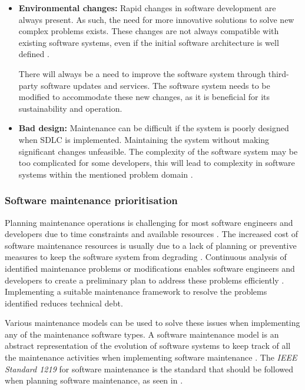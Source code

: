 \begin{itemize}
	\item \textbf{Environmental changes:} Rapid changes in software development are always present. As such, the need for more innovative solutions to solve new complex problems exists. These changes are not always compatible with existing software systems, even if the initial software architecture is well defined \cite{Ogheneovo2014}. \par There will always be a need to improve the software system through third-party software updates and services. The software system needs to be modified to accommodate these new changes, as it is beneficial for its sustainability and operation.
	\item \textbf{Bad design:} Maintenance can be difficult if the system is poorly designed when SDLC is implemented. Maintaining the system without making significant changes unfeasible. The complexity of the software system may be too complicated for some developers, this will lead to complexity in software systems within the mentioned problem domain \cite{Lenarduzzi2017}.
\end{itemize}

\subsubsection{Software maintenance prioritisation}\label{sec:ch1_maintenanceModel}
Planning maintenance operations is challenging for most software engineers and developers due to time constraints and available resources \cite{DeLeon-Sigg2020}. The increased cost of software maintenance resources is usually due to a lack of planning or preventive measures to keep the software system from degrading \cite{Alenezi2016}. Continuous analysis of identified maintenance problems or modifications enables software engineers and developers to create a preliminary plan to address these problems efficiently \cite{Port2017}. Implementing a suitable maintenance framework to resolve the problems identified reduces technical debt.\par Various maintenance models can be used to solve these issues when implementing any of the maintenance software types. A software maintenance model is an abstract representation of the evolution of software systems to keep track of all the maintenance activities when implementing software maintenance \cite{Ren2011}. The \textit{IEEE Standard 1219} for software maintenance is the standard that should be followed when planning software maintenance, as seen in . 

